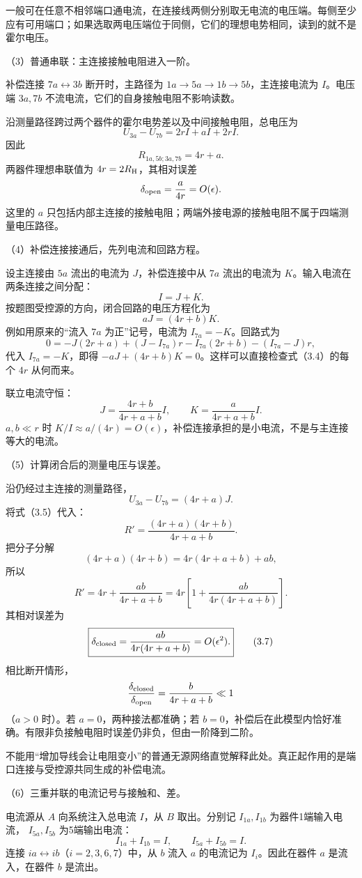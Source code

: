 \documentclass[12pt,a4paper,fontset=fandol]{ctexart}
\begin{document}
一般可在任意不相邻端口通电流，在连接线两侧分别取无电流的电压端。每侧至少应有可用端口；如果选取两电压端位于同侧，它们的理想电势相同，读到的就不是霍尔电压。

（3）普通串联：主连接接触电阻进入一阶。

补偿连接 \(7a\leftrightarrow3b\) 断开时，主路径为
\(1a\to5a\to1b\to5b\)，主连接电流为 \(I\)。电压端 \(3a,7b\)
不流电流，它们的自身接触电阻不影响读数。

沿测量路径跨过两个器件的霍尔电势差以及中间接触电阻，总电压为 \[
U_{3a}-U_{7b}=2rI+aI+2rI.
\] 因此 \[
\boxed{R_{1a,5b;3a,7b}=4r+a.}\tag{3.3}
\] 两器件理想串联值为 \(4r=2R_{\rm H}\)，其相对误差 \[
\delta_{\rm open}=\frac{a}{4r}=O(\epsilon).
\] 这里的 \(a\)
只包括内部主连接的接触电阻；两端外接电源的接触电阻不属于四端测量电压路径。

（4）补偿连接接通后，先列电流和回路方程。

设主连接由 \(5a\) 流出的电流为 \(J\)，补偿连接中从 \(7a\) 流出的电流为
\(K\)。输入电流在两条连接之间分配： \[
I=J+K.
\] 按题图受控源的方向，闭合回路的电压方程化为 \[
aJ=(4r+b)K.\tag{3.4}
\] 例如用原来的``流入 \(7a\) 为正''记号，电流为 \(I_{7a}=-K\)。回路式为
\[
0=-J(2r+a)+(J-I_{7a})r
-I_{7a}(2r+b)-(I_{7a}-J)r,
\] 代入 \(I_{7a}=-K\)，即得
\(-aJ+(4r+b)K=0\)。这样可以直接检查式（3.4）的每个 \(4r\) 从何而来。

联立电流守恒： \[
\boxed{J=\frac{4r+b}{4r+a+b}I,\qquad
K=\frac{a}{4r+a+b}I.}\tag{3.5}
\] \(a,b\ll r\) 时
\(K/I\approx a/(4r)=O(\epsilon)\)，补偿连接承担的是小电流，不是与主连接等大的电流。

（5）计算闭合后的测量电压与误差。

沿仍经过主连接的测量路径， \[
U_{3a}-U_{7b}=(4r+a)J.
\] 将式（3.5）代入： \[
R'=\frac{(4r+a)(4r+b)}{4r+a+b}.
\] 把分子分解 \[
(4r+a)(4r+b)=4r(4r+a+b)+ab,
\] 所以 \[
\boxed{R'=4r+\frac{ab}{4r+a+b}
=4r\left[1+\frac{ab}{4r(4r+a+b)}\right].}\tag{3.6}
\] 其相对误差为 \[
\boxed{\delta_{\rm closed}
=\frac{ab}{4r(4r+a+b)}=O(\epsilon^2).}\tag{3.7}
\] 相比断开情形， \[
\frac{\delta_{\rm closed}}{\delta_{\rm open}}
=\frac{b}{4r+a+b}\ll1
\] （\(a>0\) 时）。若 \(a=0\)，两种接法都准确；若
\(b=0\)，补偿后在此模型内恰好准确。有限非负接触电阻时误差仍非负，但由一阶降到二阶。

不能用``增加导线会让电阻变小''的普通无源网络直觉解释此处。真正起作用的是端口连接与受控源共同生成的补偿电流。

（6）三重并联的电流记号与接触和、差。

电流源从 \(A\) 向系统注入总电流 \(I\)，从 \(B\) 取出。分别记
\(I_{1a},I_{1b}\) 为器件1端输入电流， \(I_{5a},I_{5b}\) 为5端输出电流：
\[
I_{1a}+I_{1b}=I,\qquad
I_{5a}+I_{5b}=I.
\] 连接 \(ia\leftrightarrow ib\)（\(i=2,3,6,7\)）中，从 \(b\) 流入 \(a\)
的电流记为 \(I_i\)。因此在器件 \(a\) 是流入，在器件 \(b\) 是流出。
\end{document}

